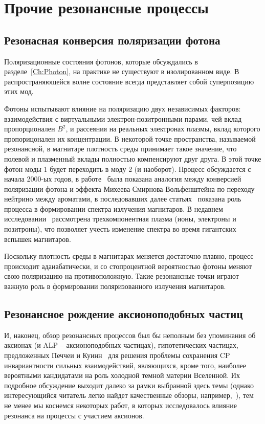 \section{Прочие резонансные процессы}

\subsection{Резонасная конверсия поляризации фотона}

Поляризационные состояния фотонов, которые обсуждались в разделе~\ref{Ch:Photon}, на практике не существуют в изолированном виде. В распространяющейся волне состояние всегда представляет собой суперпозицию этих мод.

Фотоны испытывают влияние на поляризацию двух независимых факторов: взаимодействия с виртуальными электрон-позитронными парами, чей вклад пропорционален $B^2$, и рассеяния на реальных электронах плазмы, вклад которого пропорицонален их концентрации. В некоторой точке пространства, называемой резонансной, в магнитаре плотность среды принимает такое значение, что полевой и плазменный вклады полностью компенсируют друг друга. В этой точке фотон моды 1 будет переходить в моду 2 (и наоборот). Процесс обсуждается с начала 2000-ых годов, в работе~\cite{Lai2002} была показана аналогия между конверсией поляризации фотона и эффекта Михеева-Смирнова-Вольфенштейна по переходу нейтрино между ароматами, в последовавших далее статьях~\cite{ Ho2003, vanAdelsberg2006} показана роль процесса в формировании спектра излучения магнитаров. В недавнем исследовании~\cite{Wada2025} рассмотрена трехкомпонентная плазма (ионы, электроны и позитроны), что позволяет учесть изменение спектра во время гигантских вспышек магнитаров.

Поскольку плотность среды в магнитарах меняется достаточно плавно, процесс происходит адаиабатически, и со стопроцентной вероятностью фотоны меняют свою поляризацию на противоположную. Такие резонансные точки играют важную роль в формировании поляризованного излучения магнитаров.



\subsection{Резонансное рождение аксионоподобных частиц}

И, наконец, обзор резонансных процессов был бы неполным без упоминания об 
аксионах (и ALP -- аксионоподобных частицах), 
гипотетических частицах, предложенных Печчеи и Куинн~\cite{Quinn:1977} для 
решения проблемы сохранения CP инвариантности сильных взаимодействий, 
являющихся, кроме того, наиболее вероятными кандидатами на роль холодной темной 
материи Вселенной. Их подробное обсуждение выходит далеко за рамки выбранной 
здесь темы (однако интересующийся читатель легко найдет качественные обзоры, 
например,~\cite{Kim:2010, Marsh:2016}), тем не менее мы коснемся некоторых 
работ, в которых исследовалось влияние резонанса на процессы с участием 
аксионов.

